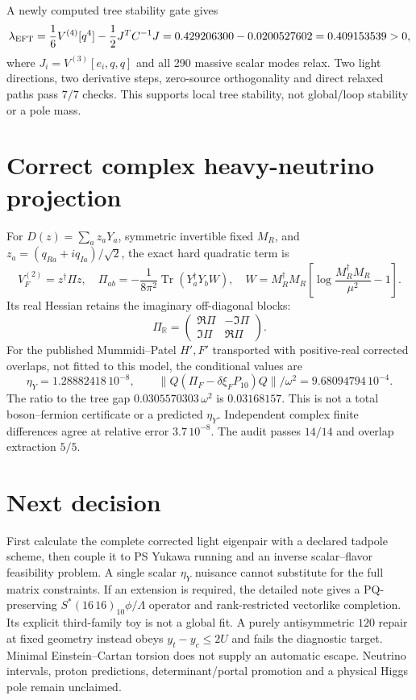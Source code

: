 \documentclass[11pt]{article}
\begin{document}
A newly computed tree stability gate gives
\[
\lambda_{\rm EFT}
=\frac16V^{(4)}[q^4]-\frac12J^TC^{-1}J
=0.429206300-0.0200527602=0.409153539>0,
\]
where $J_i=V^{(3)}[e_i,q,q]$ and all 290 massive scalar modes relax.
Two light directions, two derivative steps, zero-source orthogonality
and direct relaxed paths pass $7/7$ checks.
This supports local tree stability, not global/loop stability or a pole mass.

\section{Correct complex heavy-neutrino projection}
For $D(z)=\sum_a z_aY_a$, symmetric invertible fixed $M_R$, and
$z_a=(q_{Ra}+iq_{Ia})/\sqrt2$, the exact hard quadratic term is
\[
V_F^{(2)}=z^\dagger\Pi z,\quad
\Pi_{ab}=-\frac1{8\pi^2}\operatorname{Tr}(Y_a^\dagger Y_bW),\quad
W=M_R^\dagger M_R
\left[\log\frac{M_R^\dagger M_R}{\mu^2}-1\right].
\]
Its real Hessian retains the imaginary off-diagonal blocks:
\[
\Pi_{\mathbb R}=
\begin{pmatrix}\Re\Pi&-\Im\Pi\\\Im\Pi&\Re\Pi\end{pmatrix}.
\]
For the published Mummidi--Patel $H',F'$ transported with positive-real
corrected overlaps, not fitted to this model, the conditional values are
\[
\eta_Y=1.28882418\,10^{-8},\qquad
\|Q(\Pi_F-\delta\xi_FP_{10})Q\|/\omega^2
=9.68094794\,10^{-4}.
\]
The ratio to the tree gap $0.0305570303\,\omega^2$ is $0.03168157$.
This is not a total boson--fermion certificate or a predicted $\eta_Y$.
Independent complex finite differences agree at relative error
$3.7\,10^{-8}$. The audit passes $14/14$ and overlap extraction $5/5$.

\section{Next decision}
First calculate the complete corrected light eigenpair with a declared
tadpole scheme, then couple it to PS Yukawa running and an inverse
scalar--flavor feasibility problem. A single scalar $\eta_Y$ nuisance
cannot substitute for the full matrix constraints.
If an extension is required, the detailed note gives a PQ-preserving
$S^*(16\,16)_{10}\phi/\Lambda$ operator and rank-restricted vectorlike
completion. Its explicit third-family toy is not a global fit.
A purely antisymmetric $120$ repair at fixed geometry instead obeys
$y_t-y_c\le2U$ and fails the diagnostic target.
Minimal Einstein--Cartan torsion does not supply an automatic escape.
Neutrino intervals, proton predictions, determinant/portal promotion
and a physical Higgs pole remain unclaimed.
\end{document}
